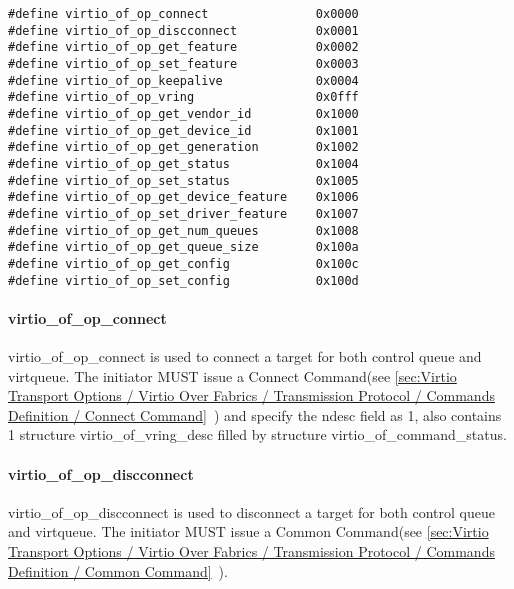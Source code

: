 \begin{lstlisting}
#define virtio_of_op_connect               0x0000
#define virtio_of_op_discconnect           0x0001
#define virtio_of_op_get_feature           0x0002
#define virtio_of_op_set_feature           0x0003
#define virtio_of_op_keepalive             0x0004
#define virtio_of_op_vring                 0x0fff
#define virtio_of_op_get_vendor_id         0x1000
#define virtio_of_op_get_device_id         0x1001
#define virtio_of_op_get_generation        0x1002
#define virtio_of_op_get_status            0x1004
#define virtio_of_op_set_status            0x1005
#define virtio_of_op_get_device_feature    0x1006
#define virtio_of_op_set_driver_feature    0x1007
#define virtio_of_op_get_num_queues        0x1008
#define virtio_of_op_get_queue_size        0x100a
#define virtio_of_op_get_config            0x100c
#define virtio_of_op_set_config            0x100d
\end{lstlisting}

\paragraph{virtio_of_op_connect}\label{sec:Virtio Transport Options / Virtio Over Fabrics / Transmission Protocol / Opcodes Definition / virtio_of_op_connect}

virtio_of_op_connect is used to connect a target for both control queue and virtqueue. The initiator MUST issue a Connect Command(see \ref{sec:Virtio Transport Options / Virtio Over Fabrics / Transmission Protocol / Commands Definition / Connect Command}~) and specify the ndesc field as 1, also contains 1 structure virtio_of_vring_desc filled by structure virtio_of_command_status.

\paragraph{virtio_of_op_discconnect}\label{sec:Virtio Transport Options / Virtio Over Fabrics / Transmission Protocol / Opcodes Definition / virtio_of_op_discconnect}

virtio_of_op_discconnect is used to disconnect a target for both control queue and virtqueue. The initiator MUST issue a Common Command(see \ref{sec:Virtio Transport Options / Virtio Over Fabrics / Transmission Protocol / Commands Definition / Common Command}~).

